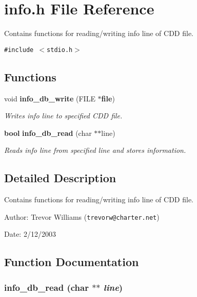 \section{info.h File Reference}
\label{info_8h}
Contains functions for reading/writing info line of CDD file. 


{\tt \#include $<$stdio.h$>$}\par
\subsection*{Functions}
\begin{CompactItemize}
\item 
void {\bf info\_\-db\_\-write} (FILE $\ast${\bf file})
\begin{CompactList}\small\item\em Writes info line to specified CDD file.\item\end{CompactList}\item 
{\bf bool} {\bf info\_\-db\_\-read} (char $\ast$$\ast$line)
\begin{CompactList}\small\item\em Reads info line from specified line and stores information.\item\end{CompactList}\end{CompactItemize}


\subsection{Detailed Description}
Contains functions for reading/writing info line of CDD file.

\begin{Desc}
\item[Author:]Trevor Williams ({\tt trevorw@charter.net}) \end{Desc}
\begin{Desc}
\item[Date:]2/12/2003 \end{Desc}


\subsection{Function Documentation}
\subsubsection{ info\_\-db\_\-read (char $\ast$$\ast$ {\em line})}\label{info_8h_a1}


